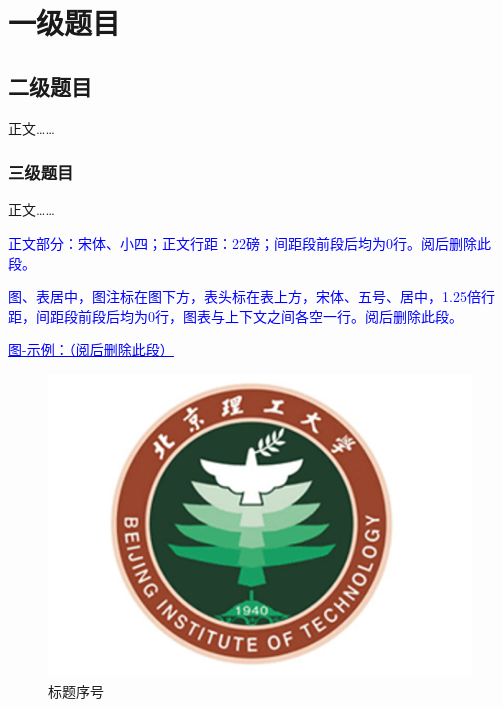 %
%
%
%
%
%

\chapter{一级题目}

\section{二级题目}
正文……\cite{yuFeiJiZongTiDuoXueKeSheJiYouHuaDeXianZhuangYuFaZhanFangXiang2008}

\subsection{三级题目}

正文……\cite{Hajela2012Application}

\textcolor{blue}{正文部分：宋体、小四；正文行距：22磅；间距段前段后均为0行。阅后删除此段。}

\textcolor{blue}{图、表居中，图注标在图下方，表头标在表上方，宋体、五号、居中，1.25倍行距，间距段前段后均为0行，图表与上下文之间各空一行。阅后删除此段。}

\textcolor{blue}{\underline{\underline{图-示例：（阅后删除此段）}}}

\begin{figure}[htbp]
  \vspace{13pt} %
  \centering
  \includegraphics[]{images/bit_logo.png}
  \caption{标题序号}\label{标题序号} %
\end{figure}

